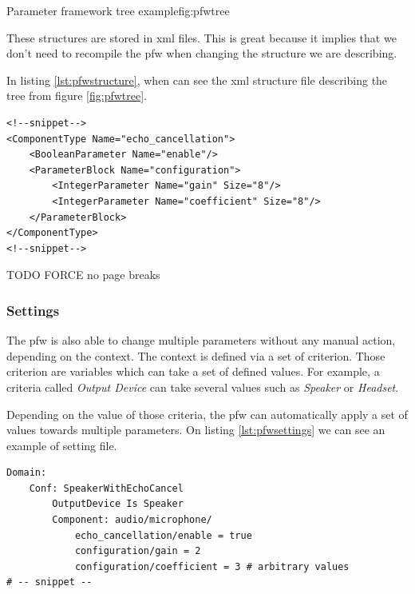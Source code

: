 \begin{figureGraphics}{Parameter framework tree example}{fig:pfwtree}
\end{figureGraphics}

These structures are stored in \gls{xml} files. This is great because it implies that we don't need
to recompile the \gls{pfw} when changing the structure we are describing.

In listing \ref{lst:pfwstructure}, when can see the \gls{xml} structure file
describing the tree from figure \ref{fig:pfwtree}.
\begin{lstlisting}[language=pfwXml, caption=Structure file example snippet, label=lst:pfwstructure]
<!--snippet-->
<ComponentType Name="echo_cancellation">
    <BooleanParameter Name="enable"/>
    <ParameterBlock Name="configuration">
        <IntegerParameter Name="gain" Size="8"/>
        <IntegerParameter Name="coefficient" Size="8"/>
    </ParameterBlock>
</ComponentType>
<!--snippet-->
\end{lstlisting}
TODO FORCE no page breaks

\subsubsection{Settings}
The \gls{pfw} is also able to change multiple parameters without any manual action, depending on the context.
The context is defined via a set of criterion. Those criterion are variables which can take a set of defined values.
For example, a criteria called \emph{Output Device} can take several values such as \emph{Speaker} or \emph{Headset}.

Depending on the value of those criteria, the \gls{pfw} can automatically apply a set of values towards
multiple parameters.
On listing \ref{lst:pfwsettings} we can see an example of setting file.
\begin{lstlisting}[language=pfwLang, caption=Settings file example, label=lst:pfwsettings]
Domain:
    Conf: SpeakerWithEchoCancel
        OutputDevice Is Speaker
        Component: audio/microphone/
            echo_cancellation/enable = true
            configuration/gain = 2
            configuration/coefficient = 3 # arbitrary values
# -- snippet --
\end{lstlisting}


